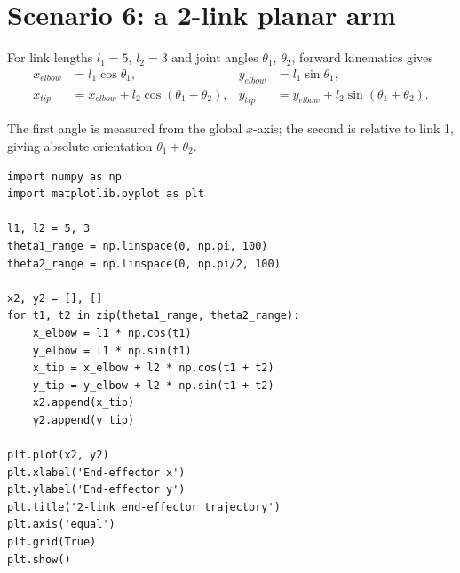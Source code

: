 \section{Scenario 6: a 2-link planar arm}

For link lengths \(l_1=5\), \(l_2=3\) and joint angles \(\theta_1\), \(\theta_2\), forward kinematics gives
\begin{align*}
x_{elbow}&=l_1\cos\theta_1,
&y_{elbow}&=l_1\sin\theta_1,\\
x_{tip}&=x_{elbow}+l_2\cos(\theta_1+\theta_2),
&y_{tip}&=y_{elbow}+l_2\sin(\theta_1+\theta_2).
\end{align*}

\begin{mlfigure}
\end{mlfigure}

The first angle is measured from the global \(x\)-axis; the second is relative to link 1, giving absolute orientation \(\theta_1+\theta_2\).

\begin{lstlisting}[style=mlpython]
import numpy as np
import matplotlib.pyplot as plt

l1, l2 = 5, 3
theta1_range = np.linspace(0, np.pi, 100)
theta2_range = np.linspace(0, np.pi/2, 100)

x2, y2 = [], []
for t1, t2 in zip(theta1_range, theta2_range):
    x_elbow = l1 * np.cos(t1)
    y_elbow = l1 * np.sin(t1)
    x_tip = x_elbow + l2 * np.cos(t1 + t2)
    y_tip = y_elbow + l2 * np.sin(t1 + t2)
    x2.append(x_tip)
    y2.append(y_tip)

plt.plot(x2, y2)
plt.xlabel('End-effector x')
plt.ylabel('End-effector y')
plt.title('2-link end-effector trajectory')
plt.axis('equal')
plt.grid(True)
plt.show()
\end{lstlisting}

